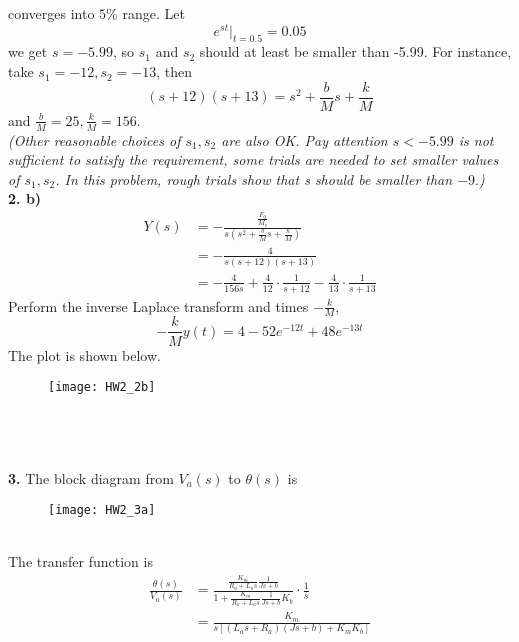 \documentclass[11pt, a4paper]{article}
\begin{document}
converges into $5\%$ range. Let
\begin{equation*}
e^{st}|_{t=0.5}=0.05
\end{equation*}
we get $s=-5.99$, so $s_1$ and $s_2$ should at least be smaller than -5.99. For instance, take $s_1=-12,s_2=-13$, then
\begin{equation*}
(s+12)(s+13)=s^2+\frac{b}{M}s+\frac{k}{M}
\end{equation*}
and $\frac{b}{M}=25,\frac{k}{M}=156$.\\
\emph{(Other reasonable choices of $s_1,s_2$ are also OK. Pay attention $s<-5.99$ is not sufficient to satisfy the requirement, some trials are needed to set smaller values of $s_1,s_2$. In this problem, rough trials show that s should be smaller than $-9.$)}
\\
\textbf{2. b)}
\begin{equation*}
\begin{split}
Y(s) &= -\frac{\frac{F_0}{M_s}}{s(s^2+\frac{b}{M}s+\frac{k}{M})}\\
     &= -\frac{4}{s(s+12)(s+13)}\\
     &= -\frac{4}{156s}+\frac{4}{12}\cdot\frac{1}{s+12}-\frac{4}{13}\cdot\frac{1}{s+13}
\end{split}
\end{equation*}
Perform the inverse Laplace transform and times $-\frac{k}{M}$,
\begin{equation*}
-\frac{k}{M}y(t) = 4-52e^{-12t}+48e^{-13t}
\end{equation*}
The plot is shown below.
\begin{figure}[h]
\texttt{[image: HW2\_2b]}
\centering
\end{figure}
\\
\\
\\
\textbf{3.} The block diagram from $V_a(s)$ to $\theta(s)$ is
\begin{figure}[h]
\texttt{[image: HW2\_3a]}
\centering
\end{figure}\\
The transfer function is
\begin{equation*}
\begin{split}
\frac{\theta(s)}{V_a(s)} &= \frac{\frac{K_m}{R_a+L_as}\frac{1}{Js+b}}{1+\frac{K_m}{R_a+L_as}\frac{1}{Js+b}K_b}\cdot\frac{1}{s}\\
                   			&= \frac{K_m}{s[(L_as+R_a)(Js+b)+K_mK_b]}
\end{split}
\end{equation*}
\end{document}
